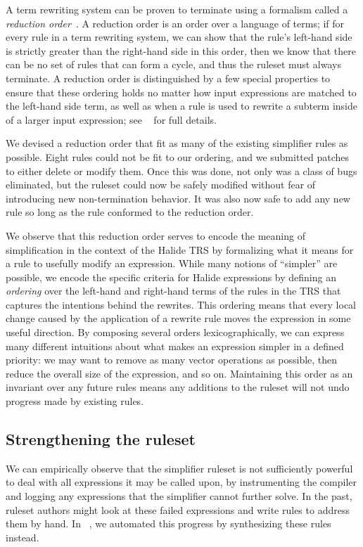 A term rewriting system can be proven to terminate using a formalism called a \emph{reduction order}~\cite{baader1999term}. A reduction order is an order over a language of terms; if for every rule in a term rewriting system, we can show that the rule's left-hand side is strictly greater than the right-hand side in this order, then we know that there can be no set of rules that can form a cycle, and thus the ruleset must always terminate. A reduction order is distinguished by a few special properties to ensure that these ordering holds no matter how input expressions are matched to the left-hand side term, as well as when a rule is used to rewrite a subterm inside of a larger input expression; see ~\cite{newcomb2020verifying} for full details.

We devised a reduction order that fit as many of the existing simplifier rules as possible. Eight rules could not be fit to our ordering, and we submitted patches to either delete or modify them. Once this was done, not only was a class of bugs eliminated, but the ruleset could now be safely modified without fear of introducing new non-termination behavior. It was also now safe to add any new rule so long as the rule conformed to the reduction order. 

We observe that this reduction order serves to encode the meaning of simplification in the context of the Halide TRS
by formalizing what it means for a rule to usefully modify an expression.  While
many notions of ``simpler'' are possible, we encode the specific criteria for Halide
expressions by defining an \emph{ordering} over the left-hand and right-hand terms of 
the rules in the TRS that captures the intentions behind the rewrites. This ordering 
means that every local change caused by the application of a rewrite rule moves the 
expression in some useful direction. By composing several orders lexicographically, 
we can express many different intuitions about what makes an expression simpler in a
defined priority: we may want to remove as many vector operations as possible, 
then reduce the overall size of the expression, and so on. Maintaining this order as 
an invariant over any future rules means any additions to the ruleset will not undo 
progress made by existing rules.

\subsection{Strengthening the ruleset}
We can empirically observe that the simplifier ruleset is not sufficiently powerful to deal with all expressions it may be called upon, by instrumenting the compiler and logging any expressions that the simplifier cannot further solve. In the past, ruleset authors might look at these failed expressions and write rules to address them by hand. In ~\cite{newcomb2020verifying}, we automated this progress by synthesizing these rules instead.


